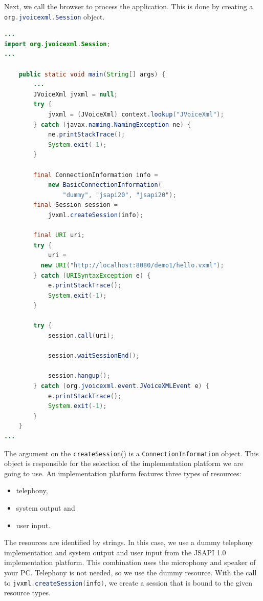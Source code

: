 \documentclass[11pt,a4paper]{book}
\begin{document}
Next, we call the browser to process the application. This is done
by creating a \lstinline[language=Java]{org.jvoicexml.Session} object.

\begin{lstlisting}[language=Java]
...
import org.jvoicexml.Session;
...

    public static void main(String[] args) {
        ...
        JVoiceXml jvxml = null;
        try {
            jvxml = (JVoiceXml) context.lookup("JVoiceXml");
        } catch (javax.naming.NamingException ne) {
            ne.printStackTrace();
            System.exit(-1);
        }

        final ConnectionInformation info =
            new BasicConnectionInformation(
                "dummy", "jsapi20", "jsapi20");
        final Session session = 
            jvxml.createSession(info);

        final URI uri;
        try {
            uri = 
          new URI("http://localhost:8080/demo1/hello.vxml");
        } catch (URISyntaxException e) {
            e.printStackTrace();
            System.exit(-1);
        }

        try {
            session.call(uri);

            session.waitSessionEnd();

            session.hangup();
        } catch (org.jvoicexml.event.JVoiceXMLEvent e) {
            e.printStackTrace();
            System.exit(-1);
        }
    }
...
\end{lstlisting}

The argument on the \lstinline[language=Java]{createSession}() is a
\lstinline[language=Java]{ConnectionInformation} object. This object is
responsible for the selection of the implementation platform we are going to
use. An implementation platform features three types of resources:
\begin{itemize}
  \item telephony,
  \item system output and
  \item user input.
\end{itemize}
The resources are identified by strings. In this case, we use a dummy telephony
implementation and system output and user input from the JSAPI 1.0
implementation platform. This combination uses the microphony and speaker of
your PC. Telephony is not needed, so we use the dummy resource. With the call to
\lstinline[language=Java]{jvxml.createSession(info)}, we create a session that
is bound to the given resource types.
\end{document}
